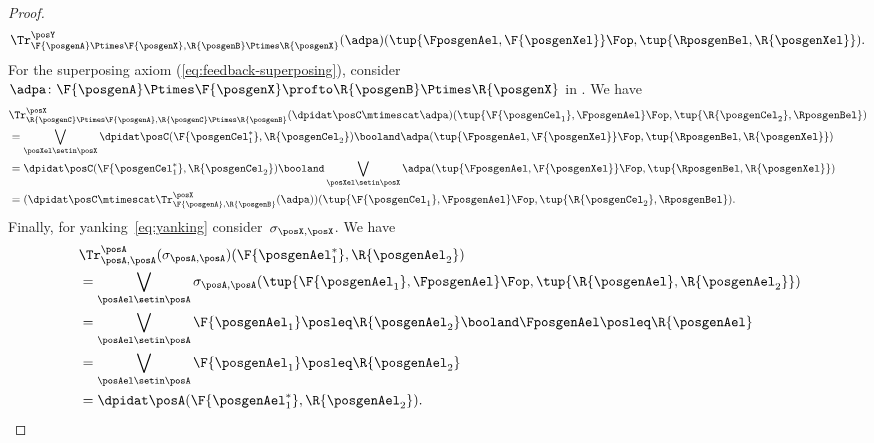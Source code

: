 {\begin{proof}
\begin{equation}
\begin{aligned}
{                    \Tr_{\F{\posgenA}\Ptimes \F{\posgenX},\R{\posgenB}\Ptimes \R{\posgenX}}^\posY(\adpa)(\tup{\FposgenAel,\F{\posgenXel}}\Fop, \tup{\RposgenBel,\R{\posgenXel}})}.
            \end{aligned}
        \end{equation}
        For the superposing axiom (\cref{eq:feedback-superposing}), consider~$\adpa\colon \F{\posgenA}\Ptimes \F{\posgenX}\profto \R{\posgenB}\Ptimes \R{\posgenX}$ in \DP.
        We have
        \begin{equation}
            \begin{aligned}
                {}
                 & \Tr_{\R{\posgenC}\Ptimes \F{\posgenA},\R{\posgenC}\Ptimes \R{\posgenB}}^{\posX}(\dpidat\posC\mtimescat \adpa)(\tup{\F{\posgenCel_1},\FposgenAel}\Fop, \tup{\R{\posgenCel_2},\RposgenBel}) \\
                 & = \bigvee_{\posXel \setin \posX} \dpidat\posC(\F{\posgenCel_1^*},\R{\posgenCel_2})\booland \adpa(\tup{\FposgenAel,\F{\posgenXel}}\Fop, \tup{\RposgenBel,\R{\posgenXel}}) \\
                 & =\dpidat\posC(\F{\posgenCel_1^*},\R{\posgenCel_2}) \booland \bigvee_{\posXel\setin \posX} \adpa(\tup{\FposgenAel,\F{\posgenXel}}\Fop, \tup{\RposgenBel,\R{\posgenXel}}) \\
                 & =(\dpidat\posC \mtimescat \Tr_{\F{\posgenA},\R{\posgenB}}^\posX(\adpa))(\tup{\F{\posgenCel_1},\FposgenAel}\Fop, \tup{\R{\posgenCel_2},\RposgenBel}).
            \end{aligned}
        \end{equation}
        Finally, for yanking~\cref{eq:yanking} consider~$\sigma_{\posX,\posX}$.
        We have
        \begin{equation}
            \begin{aligned}
                ~ & \Tr_{\posA,\posA}^{\posA}(\sigma_{\posA,\posA})(\F{\posgenAel_1^*},\R{\posgenAel_2}) \\
                  & = \bigvee_{\posAel\setin \posA} \sigma_{\posA,\posA}(\tup{\F{\posgenAel_1},\FposgenAel}\Fop, \tup{\R{\posgenAel},\R{\posgenAel_2}}) \\
                  & =\bigvee_{\posAel\setin \posA} \F{\posgenAel_1} \posleq \R{\posgenAel_2} \booland \FposgenAel\posleq \R{\posgenAel} \\
                  & =\bigvee_{\posAel\setin \posA} \F{\posgenAel_1} \posleq \R{\posgenAel_2} \\
                  & =\dpidat\posA(\F{\posgenAel_1^*},\R{\posgenAel_2}).
            \end{aligned}
        \end{equation}
    \end{proof}
}

